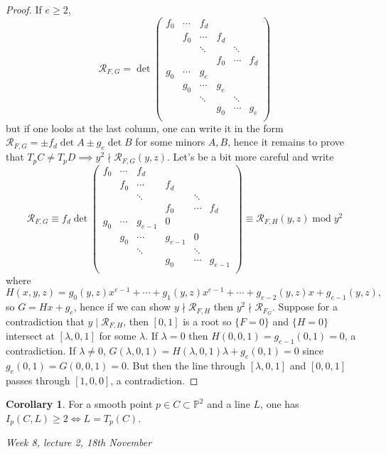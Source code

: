 \documentclass{article}
\newcommand{\p}{\mathbb{P}}
\newcommand{\Mod}{\operatorname{mod}}
\newcommand{\re}{\mathcal{R}}
\theoremstyle{definition}
\newtheorem{coro}[defn]{Corollary}
\begin{document}
\begin{proof}
If $e\geq 2$,
\[
\re_{F,G}=\det\begin{pmatrix}
f_0 & \cdots & f_d \\
& f_0 & \cdots & f_d \\
& & \ddots & & \ddots \\
& & & f_0 & \cdots & f_d \\
g_0 & \cdots & g_e \\
& g_0 & \cdots & g_e \\
& & \ddots & & \ddots \\
& & & g_0 & \cdots & g_e \\
\end{pmatrix}
\]
but if one looks at the last column, one can write it in the form $\re_{F,G}=\pm f_d\det A\pm g_e\det B$ for some minors $A,B$, hence it remains to prove that $T_pC\neq T_pD\implies y^2\nmid\re_{F,G}(y,z)$. Let's be a bit more careful and write
\[
\re_{F,G}\equiv f_d\det\begin{pmatrix}
f_0 & \cdots & f_d \\
& f_0 & \cdots & f_d \\
& & \ddots & & \ddots \\
& & & f_0 & \cdots & f_d \\
g_0 & \cdots & g_{e-1} & 0 \\
& g_0 & \cdots & g_{e-1} & 0 \\
& & \ddots & & \ddots \\
& & & g_0 & \cdots & g_{e-1} \\
\end{pmatrix}\equiv \re_{F,H}(y,z)\Mod y^2
\]
where
\[
H(x,y,z)=g_0(y,z)x^{e-1}+\cdots+g_1(y,z)x^{e-1}+\cdots+g_{e-2}(y,z)x+g_{e-1}(y,z),
\]
so $G=Hx+g_e$, hence if we can show $y\nmid \re_{F,H}$ then $y^2\nmid\re_{F_G}$. Suppose for a contradiction that $y\mid \re_{F,H}$, then $[0,1]$ is a root so $\{F=0\}$ and $\{H=0\}$ intersect at $[\lambda,0,1]$ for some $\lambda$. If $\lambda=0$ then $H(0,0,1)=g_{e-1}(0,1)=0$, a contradiction. If $\lambda\neq 0$, $G(\lambda,0,1)=H(\lambda,0,1)\lambda+g_e(0,1)=0$ since $g_e(0,1)=G(0,0,1)=0$. But then the line through $[\lambda,0,1]$ and $[0,0,1]$ passes through $[1,0,0]$, a contradiction.
\end{proof}

\begin{coro}
\label{coro:IpCLgeq2iffLisTpC}
For a smooth point $p\in C\subset\p^2$ and a line $L$, one has $I_p(C,L)\geq 2\iff L=T_p(C)$.
\end{coro}

\begin{flushright}
\textit{Week 8, lecture 2, 18th November}
\end{flushright}
\end{document}
